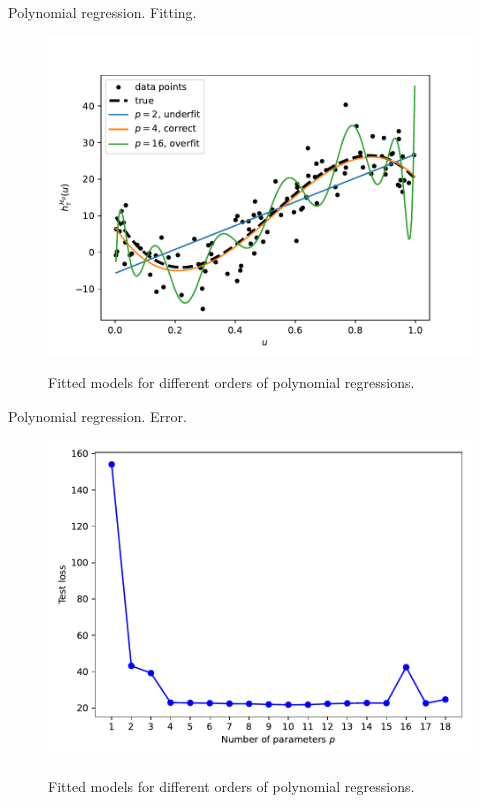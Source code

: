 \documentclass{beamer}
\begin{document}
\begin{frame}{Polynomial regression. Fitting.}
  \begin{figure}
    \includegraphics[width=0.7\linewidth]{polyfitpy}
    \label{fig:polydatpy}
    \caption{Fitted models for different orders of polynomial regressions.}
  \end{figure}
\end{frame}

\begin{frame}{Polynomial regression. Error.}
  \begin{figure}
    \includegraphics[width=0.7\linewidth]{MSEpy}
    \label{fig:MSEpy}
    \caption{Fitted models for different orders of polynomial regressions.}
  \end{figure}
\end{frame}
\end{document}
